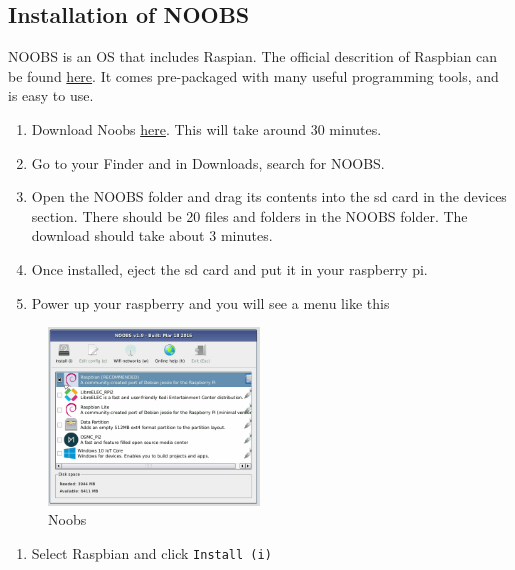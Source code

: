 \subsection{Installation of NOOBS}\label{installation-of-noobs}

NOOBS is an OS that includes Raspian. The official descrition of
Raspbian can be found
\href{https://www.raspberrypi.org/downloads/raspbian/}{here}. It comes
pre-packaged with many useful programming tools, and is easy to use.

\begin{enumerate}
\def\labelenumi{\arabic{enumi}.}

\item
  Download Noobs
  \href{https://www.raspberrypi.org/downloads/noobs/}{here}. This will
  take around 30 minutes.
\item
  Go to your Finder and in Downloads, search for NOOBS.
\item
  Open the NOOBS folder and drag its contents into the sd card in the
  devices section. There should be 20 files and folders in the NOOBS
  folder. The download should take about 3 minutes.
\item
  Once installed, eject the sd card and put it in your raspberry pi.
\item
  Power up your raspberry and you will see a menu like this
\end{enumerate}

\begin{figure}[htb]
\centering
\includegraphics[width=0.5\textwidth]{images/noobs.jpg}
\caption{Noobs}
\end{figure}

\begin{enumerate}
\def\labelenumi{\arabic{enumi}.}
\setcounter{enumi}{5}

\item
  Select Raspbian and click \texttt{Install\ (i)}
\end{enumerate}


